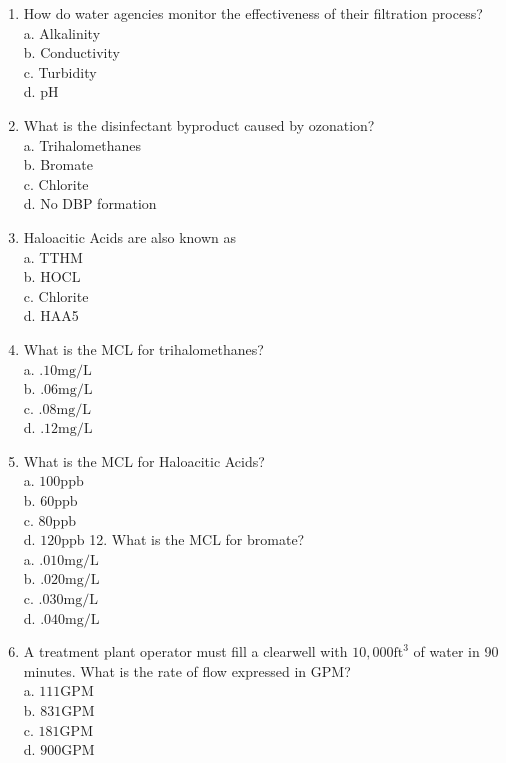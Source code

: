 \documentclass[10pt]{article}
\begin{document}
\begin{enumerate}
  \item How do water agencies monitor the effectiveness of their filtration process?\\
a. Alkalinity\\
b. Conductivity\\
c. Turbidity\\
d. $\mathrm{pH}$

  \item What is the disinfectant byproduct caused by ozonation?\\
a. Trihalomethanes\\
b. Bromate\\
c. Chlorite\\
d. No DBP formation

  \item Haloacitic Acids are also known as\\
a. TTHM\\
b. $\mathrm{HOCL}$\\
c. Chlorite\\
d. HAA5

  \item What is the MCL for trihalomethanes?\\
a. $.10 \mathrm{mg} / \mathrm{L}$\\
b. $.06 \mathrm{mg} / \mathrm{L}$\\
c. $.08 \mathrm{mg} / \mathrm{L}$\\
d. $.12 \mathrm{mg} / \mathrm{L}$

  \item What is the MCL for Haloacitic Acids?\\
a. $100 \mathrm{ppb}$\\
b. $60 \mathrm{ppb}$\\
c. $80 \mathrm{ppb}$\\
d. $120 \mathrm{ppb}$ 12. What is the $\mathrm{MCL}$ for bromate?\\
a. $.010 \mathrm{mg} / \mathrm{L}$\\
b. $.020 \mathrm{mg} / \mathrm{L}$\\
c. $.030 \mathrm{mg} / \mathrm{L}$\\
d. $.040 \mathrm{mg} / \mathrm{L}$

  \item A treatment plant operator must fill a clearwell with $10,000 \mathrm{ft}^{3}$ of water in 90 minutes. What is the rate of flow expressed in GPM?\\
a. $111 \mathrm{GPM}$\\
b. $831 \mathrm{GPM}$\\
c. $181 \mathrm{GPM}$\\
d. $900 \mathrm{GPM}$


\end{enumerate}
\end{document}
